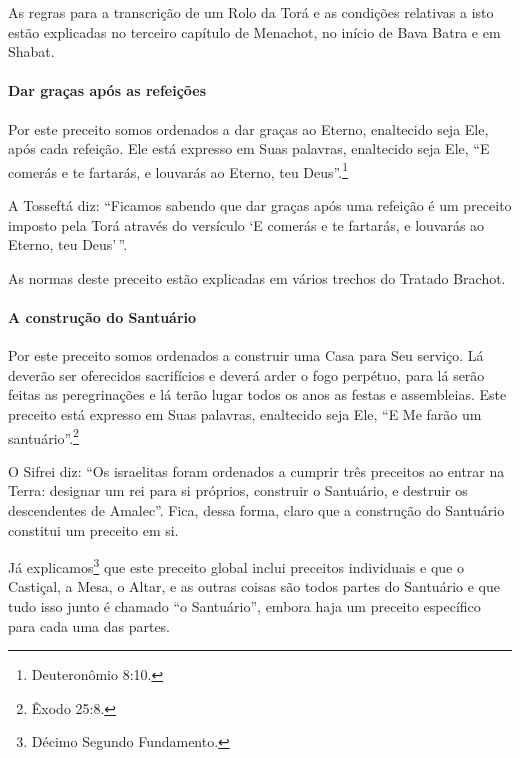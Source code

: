 \begin{multicols}{2}
As regras para a transcrição de um Rolo da Torá\starr{} e as condições
relativas a isto estão explicadas no terceiro capítulo de Menachot\starr, no
início de Bava Batra\starr{} e em Shabat.

\paragraph{Dar graças após as refeições}

Por este preceito somos ordenados a dar graças ao Eterno, enaltecido
seja Ele, após cada refeição. Ele está expresso em Suas palavras,
enaltecido seja Ele, ``E comerás e te fartarás, e louvarás ao Eterno,
teu Deus''.\footnote{Deuteronômio 8:10.}

A Tosseftá\starr{} diz: ``Ficamos sabendo que dar graças após uma refeição é um
preceito imposto pela Torá\starr{} através do versículo `E comerás e te
fartarás, e louvarás ao Eterno, teu Deus'\,''.

As normas deste preceito estão explicadas em vários trechos do Tratado
Brachot\starr.

\paragraph{A construção do Santuário}

Por este preceito somos ordenados a construir uma Casa para Seu serviço.
Lá deverão ser oferecidos sacrifícios e deverá arder o fogo perpétuo,
para lá serão feitas as peregrinações e lá terão lugar todos os anos as
festas e assembleias. Este preceito está expresso em Suas palavras,
enaltecido seja Ele, ``E Me farão um santuário''.\footnote{Êxodo 25:8.}

O Sifrei\starr{} diz: ``Os israelitas foram ordenados a cumprir três preceitos
ao entrar na Terra: designar um rei para si próprios, construir o
Santuário, e destruir os descendentes de Amalec\starr''. Fica, dessa forma,
claro que a construção do Santuário constitui um preceito em si.

Já explicamos\footnote{Décimo Segundo Fundamento.} que este preceito global inclui
preceitos individuais e que o Castiçal, a Mesa, o Altar, e as outras coisas são todos partes do Santuário e que tudo isso junto é chamado ``o Santuário'', embora
haja um preceito específico para cada uma das partes.


\end{multicols}
